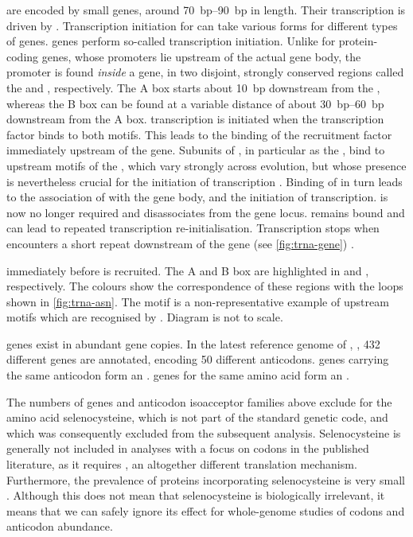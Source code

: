\trna[s] are encoded by small genes, around \SIrange{70}{90}{bp} in length.
Their transcription is driven by . Transcription initiation for  can
take various forms for different types of genes. \trna genes perform so-called
  transcription initiation. Unlike for
protein-coding genes, whose promoters lie upstream of the actual gene body, the
promoter is found \emph{inside} a \trna gene, in two disjoint, strongly
conserved regions called the  and , respectively.
The A box starts about \SI{10}{bp} downstream from the \tss, whereas the B box
can be found at a variable distance of about \SIrange{30}{60}{bp} downstream
from the A box. \trna transcription is initiated when the transcription factor
\tfiiic binds to both motifs. This leads to the binding of the  recruitment
factor \tfiiib immediately upstream of the \trna gene. Subunits of \tfiiib, in
particular as the \tbp, bind to upstream motifs of the \trna, which vary
strongly across evolution, but whose presence is nevertheless crucial for the
initiation of transcription \citep{Palida:1993,White:1992}. Binding of \tfiiib
in turn leads to the association of  with the gene body, and the initiation
of transcription. \tfiiic is now no longer required and disassociates from the
gene locus. \tfiiib remains bound and can lead to repeated transcription
re-initialisation. Transcription stops when  encounters a short \nT repeat
downstream of the \trna gene (see \cref{fig:trna-gene})
\citep{White:1998,Dieci:2007}.

    {immediately before  is recruited. The A and B box are highlighted in
    \primaryname{} and \secondaryname{}, respectively. The colours show the
    correspondence of these regions with the loops shown in \cref{fig:trna-asn}.
    The  motif is a non-representative example of upstream motifs
    which are recognised by . Diagram is not to scale.}

\trna genes exist in abundant gene copies. In the latest reference genome of
\mmu,  \citep{Church:2009}, \num{432} different \trna genes are
annotated, encoding \num{50} different anticodons. \trna genes carrying the same
anticodon form an . \trna genes for the
same amino acid form an .

The numbers of \trna genes and anticodon isoacceptor families above exclude
\trna[s] for the amino acid selenocysteine, which is not part of the standard
genetic code, and which was consequently excluded from the subsequent analysis.
Selenocysteine is generally not included in analyses with a focus on codons in
the published literature, as it requires , an
altogether different translation mechanism. Furthermore, the prevalence of
proteins incorporating selenocysteine is very small \citep{Reeves:2009}.
Although this does not mean that selenocysteine is biologically irrelevant, it
means that we can safely ignore its effect for whole-genome studies of codons
and anticodon abundance.

